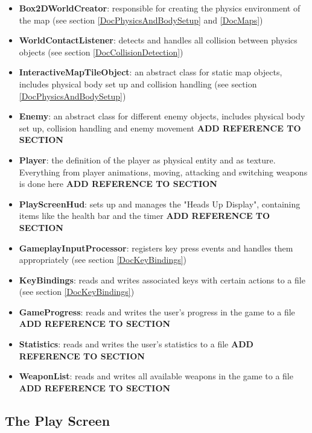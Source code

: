 \documentclass[12p]{article}
\begin{document}
\begin{itemize}
    \item \textbf{Box2DWorldCreator}: responsible for creating the physics environment of the map (see section \ref{DocPhysicsAndBodySetup} and \ref{DocMaps})
    \item \textbf{WorldContactListener}: detects and handles all collision between physics objects (see section \ref{DocCollisionDetection})
    \item \textbf{InteractiveMapTileObject}: an abstract class for static map objects, includes physical body set up and collision handling (see section \ref{DocPhysicsAndBodySetup})
    \item \textbf{Enemy}: an abstract class for different enemy objects, includes physical body set up, collision handling and enemy movement \textbf{ADD REFERENCE TO SECTION}
    \item \textbf{Player}: the definition of the player as physical entity and as texture. Everything from player animations, moving, attacking and switching weapons is done here \textbf{ADD REFERENCE TO SECTION}
    \item \textbf{PlayScreenHud}: sets up and manages the "Heads Up Display", containing items like the health bar and the timer \textbf{ADD REFERENCE TO SECTION}
    \item \textbf{GameplayInputProcessor}: registers key press events and handles them appropriately (see section \ref{DocKeyBindings})
    \item \textbf{KeyBindings}: reads and writes associated keys with certain actions to a file (see section \ref{DocKeyBindings})
    \item \textbf{GameProgress}: reads and writes the user's progress in the game to a file \textbf{ADD REFERENCE TO SECTION}
    \item \textbf{Statistics}: reads and writes the user's statistics to a file \textbf{ADD REFERENCE TO SECTION}
    \item \textbf{WeaponList}: reads and writes all available weapons in the game to a file \textbf{ADD REFERENCE TO SECTION}
\end{itemize}

 
\subsection{The Play Screen} \label{DocPlayScreen}
 
\end{document}
